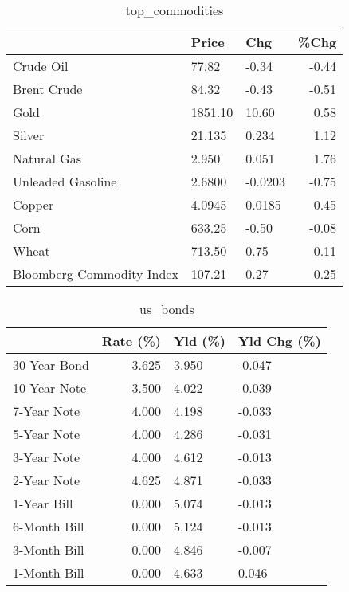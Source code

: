 \documentclass{article}%
\begin{document}
\begin{table}[htbp]%
\caption{top\_commodities}%
\centering%
\begin{adjustbox}{width=1\textwidth}%
\begin{tabular}{lllr}
\toprule
                          &   Price &     Chg &  \%Chg \\
\midrule
               Crude Oil  &   77.82 &   -0.34 & -0.44 \\
             Brent Crude  &   84.32 &   -0.43 & -0.51 \\
                    Gold  & 1851.10 &   10.60 &  0.58 \\
                  Silver  &  21.135 &   0.234 &  1.12 \\
             Natural Gas  &   2.950 &   0.051 &  1.76 \\
       Unleaded Gasoline  &  2.6800 & -0.0203 & -0.75 \\
                  Copper  &  4.0945 &  0.0185 &  0.45 \\
                    Corn  &  633.25 &   -0.50 & -0.08 \\
                   Wheat  &  713.50 &    0.75 &  0.11 \\
Bloomberg Commodity Index &  107.21 &    0.27 &  0.25 \\
\bottomrule
\end{tabular}
%
\end{adjustbox}%
\end{table}

%


\begin{table}[htbp]%
\caption{us\_bonds}%
\centering%
\begin{adjustbox}{width=1\textwidth}%
\begin{tabular}{lrll}
\toprule
             &  Rate (\%) & Yld (\%) & Yld Chg (\%) \\
\midrule
30-Year Bond &     3.625 &   3.950 &      -0.047 \\
10-Year Note &     3.500 &   4.022 &      -0.039 \\
 7-Year Note &     4.000 &   4.198 &      -0.033 \\
 5-Year Note &     4.000 &   4.286 &      -0.031 \\
 3-Year Note &     4.000 &   4.612 &      -0.013 \\
 2-Year Note &     4.625 &   4.871 &      -0.033 \\
 1-Year Bill &     0.000 &   5.074 &      -0.013 \\
6-Month Bill &     0.000 &   5.124 &      -0.013 \\
3-Month Bill &     0.000 &   4.846 &      -0.007 \\
1-Month Bill &     0.000 &   4.633 &       0.046 \\
\bottomrule
\end{tabular}
%
\end{adjustbox}%
\end{table}
\end{document}
